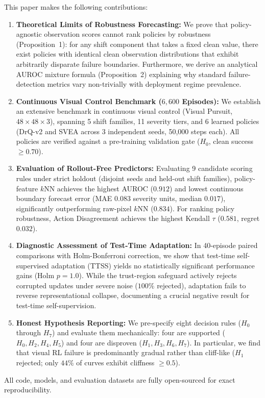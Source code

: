This paper makes the following contributions:
\begin{enumerate}
    \item \textbf{Theoretical Limits of Robustness Forecasting:} We prove that policy-agnostic observation scores cannot rank policies by robustness (Proposition~1): for any shift component that takes a fixed clean value, there exist policies with identical clean observation distributions that exhibit arbitrarily disparate failure boundaries. Furthermore, we derive an analytical AUROC mixture formula (Proposition~2) explaining why standard failure-detection metrics vary non-trivially with deployment regime prevalence.
    \item \textbf{Continuous Visual Control Benchmark ($6,600$ Episodes):} We establish an extensive benchmark in continuous visual control (Visual Pursuit, $48 \times 48 \times 3$), spanning 5 shift families, 11 severity tiers, and 6 learned policies (DrQ-v2 and SVEA across 3 independent seeds, 50,000 steps each). All policies are verified against a pre-training validation gate ($H_0$, clean success $\ge 0.70$).
    \item \textbf{Evaluation of Rollout-Free Predictors:} Evaluating 9 candidate scoring rules under strict holdout (disjoint seeds and held-out shift families), policy-feature $k$NN achieves the highest AUROC ($0.912$) and lowest continuous boundary forecast error (MAE $0.083$ severity units, median $0.017$), significantly outperforming raw-pixel $k$NN ($0.834$). For ranking policy robustness, Action Disagreement achieves the highest Kendall $\tau$ ($0.581$, regret $0.032$).
    \item \textbf{Diagnostic Assessment of Test-Time Adaptation:} In 40-episode paired comparisons with Holm-Bonferroni correction, we show that test-time self-supervised adaptation (TTSS) yields no statistically significant performance gains (Holm $p = 1.0$). While the trust-region safeguard actively rejects corrupted updates under severe noise ($100\%$ rejected), adaptation fails to reverse representational collapse, documenting a crucial negative result for test-time self-supervision.
    \item \textbf{Honest Hypothesis Reporting:} We pre-specify eight decision rules ($H_0$ through $H_7$) and evaluate them mechanically: four are supported ($H_0, H_2, H_4, H_5$) and four are disproven ($H_1, H_3, H_6, H_7$). In particular, we find that visual RL failure is predominantly gradual rather than cliff-like ($H_1$ rejected; only $44\%$ of curves exhibit cliffness $\ge 0.5$).
\end{enumerate}
All code, models, and evaluation datasets are fully open-sourced for exact reproducibility.
